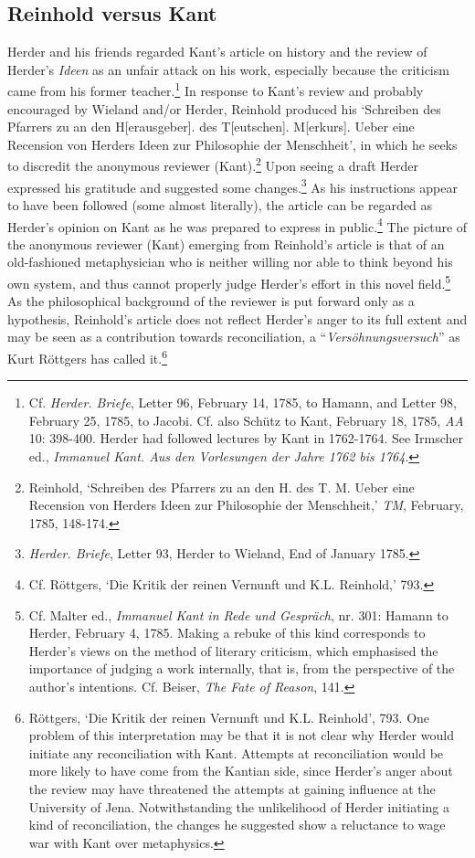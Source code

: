 \subsection{Reinhold versus Kant}


Herder and his friends regarded Kant's article on history and the review of Herder's \textit{Ideen }as an unfair attack on his work, especially because the criticism came from his former teacher.\footnote{ Cf. \textit{Herder. Briefe}, Letter 96, February 14, 1785, to Hamann, and Letter 98, February 25, 1785, to Jacobi. Cf. also Sch\"{u}tz to Kant, February 18, 1785, \textit{AA} 10: 398{-}400. Herder had followed lectures by Kant in 1762{-}1764. See Irmscher ed., \textit{Immanuel Kant. Aus den Vorlesungen der Jahre 1762 bis 1764}.} In response to Kant's review and probably encouraged by Wieland and/or Herder, Reinhold produced his `Schreiben des Pfarrers zu \textasteriskcentered \textasteriskcentered \textasteriskcentered  an den H[erausgeber]. des T[eutschen]. M[erkurs]. Ueber eine Recension von Herders Ideen zur Philosophie der Menschheit', in which he seeks to discredit the anonymous reviewer (Kant).\footnote{ Reinhold, `Schreiben des Pfarrers zu \textasteriskcentered \textasteriskcentered \textasteriskcentered  an den H. des T. M. Ueber eine Recension von Herders Ideen zur Philosophie der Menschheit,' \textit{TM}, February, 1785, 148{-}174.} Upon seeing a draft Herder expressed his gratitude and suggested some changes.\footnote{ \textit{Herder. Briefe}, Letter 93, Herder to Wieland, End of January 1785. } As his instructions appear to have been followed (some almost literally), the article can be regarded as Herder's opinion on Kant as he was prepared to express in public.\footnote{ Cf. R\"{o}ttgers, `Die Kritik der reinen Vernunft und K.L. Reinhold,' 793.} The picture of the anonymous reviewer (Kant) emerging from Reinhold's article is that of an old{-}fashioned metaphysician who is neither willing nor able to think beyond his own system, and thus cannot properly judge Herder's effort in this novel field.\footnote{ Cf. Malter ed., \textit{Immanuel Kant in Rede und Gespr\"{a}ch}, nr. 301: Hamann to Herder, February 4, 1785. Making a rebuke of this kind corresponds to Herder's views on the method of literary criticism, which emphasised the importance of judging a work internally, that is, from the perspective of the author's intentions. Cf. Beiser, \textit{The Fate of Reason}, 141. } As the philosophical background of the reviewer is put forward only as a hypothesis, Reinhold's article does not reflect Herder's anger to its full extent and may be seen as a contribution towards reconciliation, a ``\textit{Vers\"{o}hnungsversuch}'' as Kurt R\"{o}ttgers has called it.\footnote{ R\"{o}ttgers, `Die Kritik der reinen Vernunft und K.L. Reinhold', 793. One problem of this interpretation may be that it is not clear why Herder would initiate any reconciliation with Kant. Attempts at reconciliation would be more likely to have come from the Kantian side, since Herder's anger about the review may have threatened the attempts at gaining influence at the University of Jena. Notwithstanding the unlikelihood of Herder initiating a kind of reconciliation, the changes he suggested show a reluctance to wage war with Kant over metaphysics.} 

